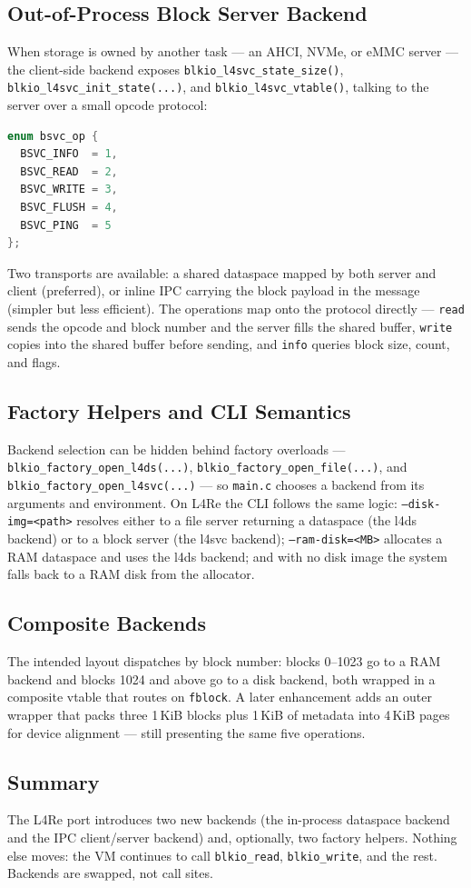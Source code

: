 \subsection{Out-of-Process Block Server Backend}

When storage is owned by another task --- an AHCI, NVMe, or eMMC server --- the
client-side backend exposes \texttt{blkio\_l4svc\_state\_size()},
\texttt{blkio\_l4svc\_init\_state(...)}, and \texttt{blkio\_l4svc\_vtable()},
talking to the server over a small opcode protocol:

\begin{lstlisting}[language=C]
enum bsvc_op {
  BSVC_INFO  = 1,
  BSVC_READ  = 2,
  BSVC_WRITE = 3,
  BSVC_FLUSH = 4,
  BSVC_PING  = 5
};
\end{lstlisting}

Two transports are available: a shared dataspace mapped by both server and
client (preferred), or inline IPC carrying the block payload in the message
(simpler but less efficient). The operations map onto the protocol directly ---
\texttt{read} sends the opcode and block number and the server fills the shared
buffer, \texttt{write} copies into the shared buffer before sending, and
\texttt{info} queries block size, count, and flags.

\subsection{Factory Helpers and CLI Semantics}

Backend selection can be hidden behind factory overloads ---
\texttt{blkio\_factory\_open\_l4ds(...)},
\texttt{blkio\_factory\_open\_file(...)}, and
\texttt{blkio\_factory\_open\_l4svc(...)} --- so \texttt{main.c} chooses a
backend from its arguments and environment. On L4Re the CLI follows the same
logic: \texttt{--disk-img=<path>} resolves either to a file server returning a
dataspace (the l4ds backend) or to a block server (the l4svc backend);
\texttt{--ram-disk=<MB>} allocates a RAM dataspace and uses the l4ds backend;
and with no disk image the system falls back to a RAM disk from the allocator.

\subsection{Composite Backends}

The intended layout dispatches by block number: blocks 0--1023 go to a RAM
backend and blocks 1024 and above go to a disk backend, both wrapped in a
composite vtable that routes on \texttt{fblock}. A later enhancement adds an
outer wrapper that packs three 1\,KiB blocks plus 1\,KiB of metadata into 4\,KiB
pages for device alignment --- still presenting the same five operations.

\subsection{Summary}

The L4Re port introduces two new backends (the in-process dataspace backend and
the IPC client/server backend) and, optionally, two factory helpers. Nothing
else moves: the VM continues to call \texttt{blkio\_read},
\texttt{blkio\_write}, and the rest. Backends are swapped, not call sites.
